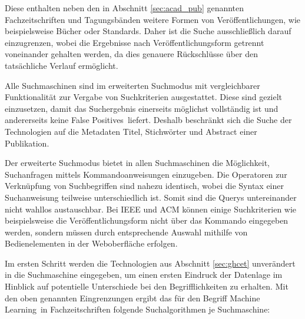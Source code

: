 Diese enthalten neben den in Abschnitt \ref{sec:acad_pub} genannten Fachzeitschriften und Tagungsbänden weitere Formen von Veröffentlichungen, wie beispielsweise Bücher oder Standards. Daher ist die Suche ausschließlich darauf einzugrenzen, wobei die Ergebnisse nach Veröffentlichungsform getrennt voneinander gehalten werden, da dies genauere Rückschlüsse über den tatsächliche Verlauf ermöglicht.

Alle Suchmaschinen sind im erweiterten Suchmodus mit vergleichbarer Funktionalität zur Vergabe von Suchkriterien ausgestattet. Diese sind gezielt einzusetzen, damit das Suchergebnis einerseits möglichst vollständig ist und andererseits keine \glqq False Positives\grqq~liefert. Deshalb beschränkt sich die Suche der Technologien auf die Metadaten Titel, Stichwörter und Abstract einer Publikation.

Der erweiterte Suchmodus bietet in allen Suchmaschinen die Möglichkeit, Suchanfragen mittels Kommandoanweisungen einzugeben. Die Operatoren zur Verknüpfung von Suchbegriffen sind nahezu identisch, wobei die Syntax einer Suchanweisung teilweise unterschiedlich ist. Somit sind die Querys untereinander nicht wahllos austauschbar. Bei IEEE und ACM können einige Suchkriterien wie beispielsweise die Veröffentlichungsform nicht über das Kommando eingegeben werden, sondern müssen durch entsprechende Auswahl mithilfe von Bedienelementen in der Weboberfläche erfolgen.

Im ersten Schritt werden die Technologien aus Abschnitt \ref{sec:ghcet} unverändert in die Suchmaschine eingegeben, um einen ersten Eindruck der Datenlage im Hinblick auf potentielle Unterschiede bei den Begrifflichkeiten zu erhalten. Mit den oben genannten Eingrenzungen ergibt das für den Begriff \glqq Machine Learning\grqq~in Fachzeitschriften folgende Suchalgorithmen je Suchmaschine:

